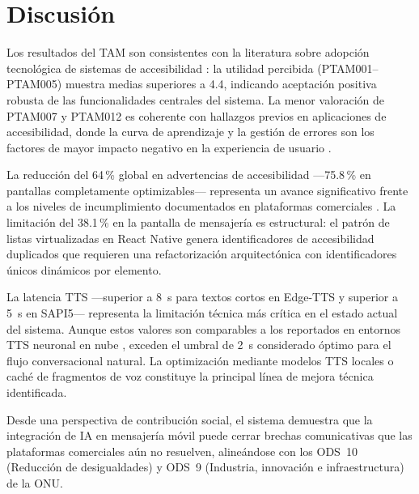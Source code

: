 \documentclass[journal]{IEEEtran}
\begin{document}
\section{Discusi\'on}
\label{sec:discusion}

Los resultados del TAM son consistentes con la literatura sobre adopci\'on tecnol\'ogica de sistemas de accesibilidad \cite{davis1989, weichbroth2020}: la utilidad percibida (PTAM001--PTAM005) muestra medias superiores a 4.4, indicando aceptaci\'on positiva robusta de las funcionalidades centrales del sistema. La menor valoraci\'on de PTAM007 y PTAM012 es coherente con hallazgos previos en aplicaciones de accesibilidad, donde la curva de aprendizaje y la gesti\'on de errores son los factores de mayor impacto negativo en la experiencia de usuario \cite{huang2025}.

La reducci\'on del 64\,\% global en advertencias de accesibilidad ---75.8\,\% en pantallas completamente optimizables--- representa un avance significativo frente a los niveles de incumplimiento documentados en plataformas comerciales \cite{chen2022}. La limitaci\'on del 38.1\,\% en la pantalla de mensajer\'ia es estructural: el patr\'on de listas virtualizadas en React Native genera identificadores de accesibilidad duplicados que requieren una refactorizaci\'on arquitect\'onica con identificadores \'unicos din\'amicos por elemento.

La latencia TTS ---superior a 8~s para textos cortos en Edge-TTS y superior a 5~s en SAPI5--- representa la limitaci\'on t\'ecnica m\'as cr\'itica en el estado actual del sistema. Aunque estos valores son comparables a los reportados en entornos TTS neuronal en nube \cite{tan2021}, exceden el umbral de 2~s considerado \'optimo para el flujo conversacional natural. La optimizaci\'on mediante modelos TTS locales o cach\'e de fragmentos de voz constituye la principal l\'inea de mejora t\'ecnica identificada.

Desde una perspectiva de contribuci\'on social, el sistema demuestra que la integraci\'on de IA en mensajer\'ia m\'ovil puede cerrar brechas comunicativas que las plataformas comerciales a\'un no resuelven, alineándose con los ODS~10 (Reducci\'on de desigualdades) y ODS~9 (Industria, innovaci\'on e infraestructura) de la ONU.

\end{document}
